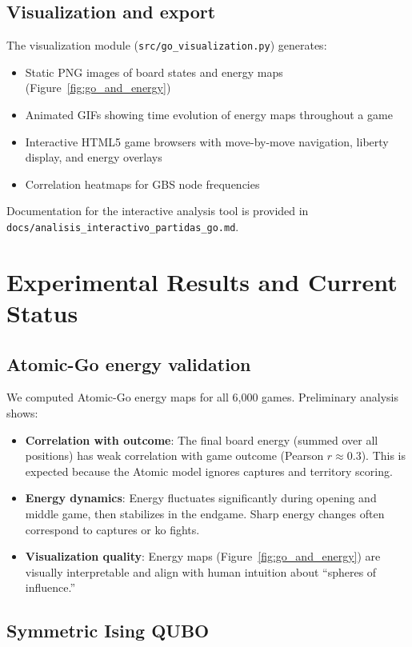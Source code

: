 \documentclass[aps,prl,reprint]{revtex4-2}
\begin{document}
\subsection{Visualization and export}

The visualization module (\texttt{src/go\_visualization.py}) generates:
\begin{itemize}
	\item Static PNG images of board states and energy maps (Figure~\ref{fig:go_and_energy})
	\item Animated GIFs showing time evolution of energy maps throughout a game
	\item Interactive HTML5 game browsers with move-by-move navigation, liberty display, and energy overlays
	\item Correlation heatmaps for GBS node frequencies
\end{itemize}

Documentation for the interactive analysis tool is provided in \texttt{docs/analisis\_interactivo\_partidas\_go.md}.

\section{Experimental Results and Current Status}

\subsection{Atomic-Go energy validation}

We computed Atomic-Go energy maps for all 6,000 games. Preliminary analysis shows:
\begin{itemize}
	\item \textbf{Correlation with outcome}: The final board energy (summed over all positions) has weak correlation with game outcome (Pearson $r \approx 0.3$). This is expected because the Atomic model ignores captures and territory scoring.
	\item \textbf{Energy dynamics}: Energy fluctuates significantly during opening and middle game, then stabilizes in the endgame. Sharp energy changes often correspond to captures or ko fights.
	\item \textbf{Visualization quality}: Energy maps (Figure~\ref{fig:go_and_energy}) are visually interpretable and align with human intuition about ``spheres of influence.''
\end{itemize}

\subsection{Symmetric Ising QUBO}
\end{document}
